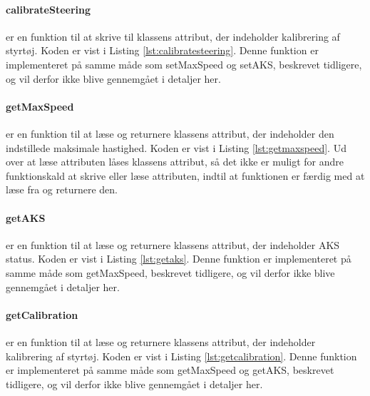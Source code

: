 

\clearpage

\paragraph{calibrateSteering} er en funktion til at skrive til klassens attribut, der indeholder kalibrering af styrtøj. Koden er vist i Listing \ref{lst:calibratesteering}. Denne funktion er implementeret på samme måde som setMaxSpeed og setAKS, beskrevet tidligere, og vil derfor ikke blive gennemgået i detaljer her.




\paragraph{getMaxSpeed}  er en funktion til at læse og returnere klassens attribut, der indeholder den indstillede maksimale hastighed. Koden er vist i Listing \ref{lst:getmaxspeed}. Ud over at læse attributen låses klassens attribut, så det ikke er muligt for andre funktionskald at skrive eller læse attributen, indtil at funktionen er færdig med at læse fra og returnere den.




\paragraph{getAKS}  er en funktion til at læse og returnere klassens attribut, der indeholder AKS status. Koden er vist i Listing \ref{lst:getaks}. Denne funktion er implementeret på samme måde som getMaxSpeed, beskrevet tidligere, og vil derfor ikke blive gennemgået i detaljer her.




\paragraph{getCalibration}  er en funktion til at læse og returnere klassens attribut, der indeholder kalibrering af styrtøj. Koden er vist i Listing \ref{lst:getcalibration}. Denne funktion er implementeret på samme måde som getMaxSpeed og getAKS, beskrevet tidligere, og vil derfor ikke blive gennemgået i detaljer her.

